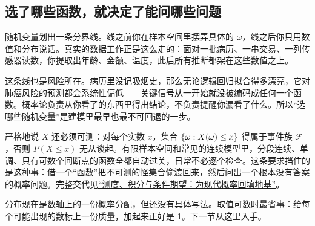 \subsection{选了哪些函数，就决定了能问哪些问题}

随机变量划出一条分界线。线之前你在样本空间里摆弄具体的 \(\omega\)，线之后你只用数值和分布说话。真实的数据工作正是这么走的：面对一批病历、一串交易、一列传感器读数，你提取出年龄、金额、温度，此后所有推断都架在这些数值之上。

这条线也是风险所在。病历里没记吸烟史，那么无论逻辑回归拟合得多漂亮，它对肺癌风险的预测都会系统性偏低——关键信号从一开始就没被编码成任何一个函数。概率论负责从你看了的东西里得出结论，不负责提醒你漏看了什么。所以``选哪些随机变量''是建模里最早也最不可回退的一步。

\begin{remark}
严格地说 \(X\) 还必须可测：对每个实数 \(x\)，集合 \(\left\{\omega:X(\omega)\le x\right\}\) 得属于事件族 \(\mathcal F\)，否则 \(P(X\le x)\) 无从谈起。有限样本空间和常见的连续模型里，分段连续、单调、只有可数个间断点的函数全都自动过关，日常不必逐个检查。这条要求挡住的是这种事：借一个``函数''把不可测的怪集合偷渡回来，然后问出一个根本没有答案的概率问题。完整交代见\hyperref[ch:101]{``测度、积分与条件期望：为现代概率回填地基''}。
\end{remark}

分布现在是数轴上的一份概率分配，但还没有具体写法。取值可数时最省事：给每个可能出现的数标上一份质量，加起来正好是 1。下一节从这里入手。
